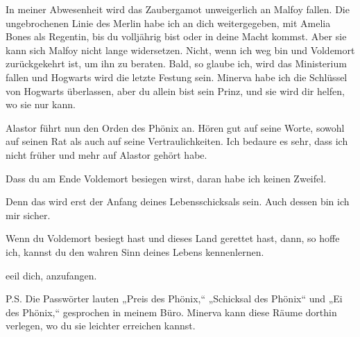 \begin{writtenNote}
In meiner Abwesenheit wird das Zaubergamot unweigerlich an Malfoy fallen. Die ungebrochenen Linie des Merlin habe ich an dich weitergegeben, mit Amelia Bones als Regentin, bis du volljährig bist oder in deine Macht kommst. Aber sie kann sich Malfoy nicht lange widersetzen. Nicht, wenn ich weg bin und Voldemort zurückgekehrt ist, um ihn zu beraten. Bald, so glaube ich, wird das Ministerium fallen und Hogwarts wird die letzte Festung sein. Minerva habe ich die Schlüssel von Hogwarts überlassen, aber du allein bist sein Prinz, und sie wird dir helfen, wo sie nur kann.

Alastor führt nun den Orden des Phönix an. Hören gut auf seine Worte, sowohl auf seinen Rat als auch auf seine Vertraulichkeiten. Ich bedaure es sehr, dass ich nicht früher und mehr auf Alastor gehört habe.

Dass du am Ende Voldemort besiegen wirst, daran habe ich keinen Zweifel.

Denn das wird erst der Anfang deines Lebensschicksals sein. Auch dessen bin ich mir sicher.

Wenn du Voldemort besiegt hast und dieses Land gerettet hast, dann, so hoffe ich, kannst du den wahren Sinn deines Lebens kennenlernen.

eeil dich, anzufangen.


P.S. Die Passwörter lauten „Preis des Phönix,“ „Schicksal des Phönix“ und „Ei des Phönix,“ gesprochen in meinem Büro. Minerva kann diese Räume dorthin verlegen, wo du sie leichter erreichen kannst.
\end{writtenNote}

